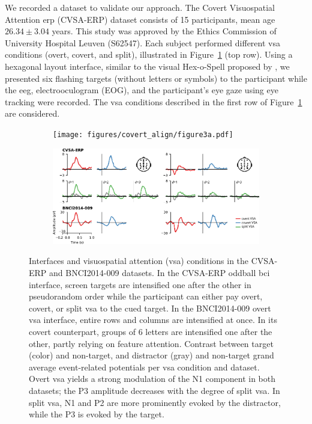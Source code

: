 We recorded a dataset to validate our approach.
The Covert Visuospatial Attention \ac{erp} (CVSA-ERP) dataset
consists of 15 participants, mean age $26.34\pm3.04$ years.
This study was approved by the Ethics Commission of University Hospital Leuven
(S62547).
Each subject performed different \ac{vsa} conditions (overt, covert, and split),
illustrated in Figure~\ref{fig:interface} (top row).
Using a hexagonal layout interface, similar to the visual Hex-o-Spell proposed
by \textcite{Treder2010}, we presented six flashing targets (without letters or
symbols) to the participant while the \ac{eeg}, electrooculogram (EOG), and the
participant's eye gaze using eye tracking were recorded.
The \ac{vsa} conditions described in the first row of Figure~\ref{fig:interface} are
considered.
\begin{figure}
  \bigskip
	\begin{subfigure}{\linewidth}
		\caption{}%
		\label{fig:interface}
		\texttt{[image: figures/covert\_align/figure3a.pdf]}
	\end{subfigure}

	\bigskip
	\bigskip
	\begin{subfigure}{\linewidth}
		\caption{}%
		\label{fig:erps}
		\includegraphics[width=\linewidth]{figures/covert_align/figure3b.pdf}
	\end{subfigure}%

  \caption[Stimulation interfaces and evoked \acsp{erp}.]{%
		 Interfaces and visuospatial attention (\ac{vsa})
    conditions in the CVSA-ERP and BNCI2014-009 datasets.
		In the CVSA-ERP oddball \ac{bci} interface, screen targets are intensified one after
    the other in pseudorandom order while the participant can either pay overt,
    covert, or split \ac{vsa} to the cued target.
		In the BNCI2014-009 overt \ac{vsa} interface, entire rows and columns are
		intensified at once. In its covert counterpart,
		groups of 6 letters are intensified one after the other, partly relying on
    feature attention.
		 Contrast between target (color) and non-target, and
    distractor (gray) and non-target grand average event-related potentials per \ac{vsa} condition and dataset.
    Overt \ac{vsa} yields a strong modulation of the N1 component in both datasets;
    the P3 amplitude decreases with the degree of split \ac{vsa}.
    In split \ac{vsa}, N1 and P2 are more prominently evoked by the distractor,
    while the P3 is evoked by the target.
	}
\end{figure}

